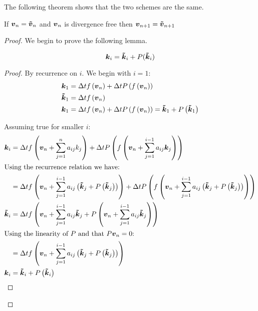 The following theorem shows that the two schemes are the same.

\begin{theorem}
If ${\boldsymbol {v}}_{n}={\boldsymbol {\tilde{v}}}_{n}$ and ${\boldsymbol {v}}_n$ is divergence free then ${\boldsymbol {v}}_{n+1}={\boldsymbol {\tilde{v}}}_{n+1}$ 
\end{theorem}
\begin{proof}
We begin to prove the following lemma.
\begin{lemma}
\begin{equation}
  {\boldsymbol {k}}_{i}={\boldsymbol {\tilde{k}}}_{i}+P({\boldsymbol {\tilde{k}}}_{i})
\end{equation}
\end{lemma}
\begin{proof}
By recurrence on $i$.
We begin with $i=1$:
\begin{align}
  {\boldsymbol {k}}_{1}&=\Delta tf\left({\boldsymbol {v}}_n\right)+\Delta tP\left(f\left({\boldsymbol {v}}_n\right)\right)\\
{\boldsymbol {\tilde{k}}}_{1}&=\Delta tf\left({\boldsymbol {v}}_n\right)\\
  {\boldsymbol {k}}_{1}&=\Delta t f\left({\boldsymbol {v}}_n\right)+\Delta tP\left(f\left({\boldsymbol {v}}_n\right)\right)={\boldsymbol {\tilde{k}}}_1+P\left({\boldsymbol {\tilde{k}}}_1\right)
\end{align}

Assuming true for smaller $i$:
\begin{align*}
  {\boldsymbol {k}}_{i}&=\Delta tf\left({\boldsymbol {v}}_n+\sum_{j=1}^{n}a_{ij}k_{j}\right)+\Delta tP\left(f\left({\boldsymbol {v}}_n+\sum_{j=1}^{i-1}a_{ij}{\boldsymbol {k}}_{j}\right)\right)\\
  \intertext{Using the recurrence relation we have:}
  &=\Delta tf\left({\boldsymbol {v}}_n+\sum_{j=1}^{i-1}a_{ij}\left({\boldsymbol {\tilde{k}}}_{j}+P\left({\boldsymbol {\tilde{k}}}_{j}\right)\right)\right)+\Delta tP\left(f\left({\boldsymbol {v}}_n+\sum_{j=1}^{i-1}a_{ij}\left({\boldsymbol {\tilde{k}}}_{j}+P\left({\boldsymbol {\tilde{k}}}_{j}\right)\right)\right)\right)\\
  {\boldsymbol {\tilde{k}}}_{i}&=\Delta tf\left({\boldsymbol {v}}_n+\sum_{j=1}^{i-1}a_{ij}{\boldsymbol {\tilde{k}}}_{j}+P\left({\boldsymbol {v}}_n+\sum_{j=1}^{i-1}a_{ij}{\boldsymbol {\tilde{k}}}_{j}\right)\right)\\
  \intertext{Using the linearity of $P$ and that $P{\boldsymbol {v}}_{n}=0$:}
  &=\Delta tf\left({\boldsymbol {v}}_n+\sum_{j=1}^{i-1}a_{ij}\left({\boldsymbol {\tilde{k}}}_{j}+P\left({\boldsymbol {\tilde{k}}}_{j}\right)\right)\right)\\
  {\boldsymbol {k}}_{i}&={\boldsymbol {\tilde{k}}}_{i}+P\left({\boldsymbol {\tilde{k}}}_{i}\right)
\end{align*}
\end{proof}


\end{proof}
